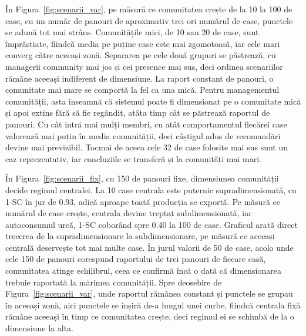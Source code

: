 \documentclass[12pt,a4paper]{report}
\begin{document}
În Figura~\ref{fig:scenarii_var}, pe măsură ce comunitatea crește de la 10 la 100 de case, cu un număr de panouri de aproximativ trei ori numărul de case, punctele se adună tot mai strâns. Comunitățile mici, de 10 sau 20 de case, sunt împrăștiate, fiindcă media pe puține case este mai zgomotoasă, iar cele mari converg către aceeași zonă. Separarea pe cele două grupuri se păstrează, cu managerii community mai jos și cei presence mai sus, deci ordinea scenariilor rămâne aceeași indiferent de dimensiune. La raport constant de panouri, o comunitate mai mare se comportă la fel ca una mică. Pentru managementul comunității, asta înseamnă că sistemul poate fi dimensionat pe o comunitate mică și apoi extins fără să fie regândit, atâta timp cât se păstrează raportul de panouri. Cu cât intră mai mulți membri, cu atât comportamentul fiecărei case valorează mai puțin în media comunității, deci câștigul adus de recomandări devine mai previzibil. Tocmai de aceea cele 32 de case folosite mai sus sunt un caz reprezentativ, iar concluziile se transferă și la comunități mai mari.

În Figura~\ref{fig:scenarii_fix}, cu 150 de panouri fixe, dimensiunea comunității decide regimul centralei. La 10 case centrala este puternic supradimensionată, cu 1-SC în jur de 0.93, adică aproape toată producția se exportă. Pe măsură ce numărul de case crește, centrala devine treptat subdimensionată, iar autoconsumul urcă, 1-SC coborând spre 0.40 la 100 de case. Graficul arată direct trecerea de la supradimensionare la subdimensionare, pe măsură ce aceeași centrală deservește tot mai multe case. În jurul valorii de 50 de case, acolo unde cele 150 de panouri corespund raportului de trei panouri de fiecare casă, comunitatea atinge echilibrul, ceea ce confirmă încă o dată că dimensionarea trebuie raportată la mărimea comunității. Spre deosebire de Figura~\ref{fig:scenarii_var}, unde raportul rămânea constant și punctele se grupau în aceeași zonă, aici punctele se înșiră de-a lungul unei curbe, fiindcă centrala fixă rămâne aceeași în timp ce comunitatea crește, deci regimul ei se schimbă de la o dimensiune la alta.
\end{document}
